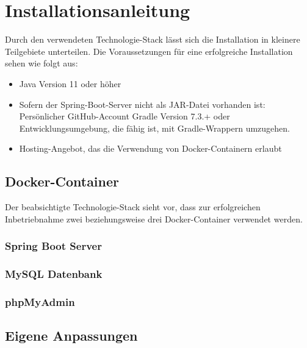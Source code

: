 \documentclass[../main.tex]{subfiles}
\begin{document}
	\section{Installationsanleitung}
	Durch den verwendeten Technologie-Stack lässt sich die Installation in kleinere Teilgebiete unterteilen. Die Voraussetzungen für eine erfolgreiche Installation sehen wie folgt aus:
	\begin{itemize}
		\item Java Version 11 oder höher
		\item Sofern der Spring-Boot-Server nicht als JAR-Datei vorhanden ist:
		\subitem Persönlicher GitHub-Account
		\subitem Gradle Version 7.3.+ oder Entwicklungsumgebung, die fähig ist, mit Gradle-Wrappern umzugehen.
		\item Hosting-Angebot, das die Verwendung von Docker-Containern erlaubt
	\end{itemize}
	
	\subsection{Docker-Container}
	Der beabsichtigte Technologie-Stack sieht vor, dass zur erfolgreichen Inbetriebnahme zwei beziehungsweise drei Docker-Container verwendet werden. 
	\subsubsection{Spring Boot Server}
	\subsubsection{MySQL Datenbank}
	\subsubsection{phpMyAdmin}
	
	\subsection{Eigene Anpassungen}
	
\end{document}
